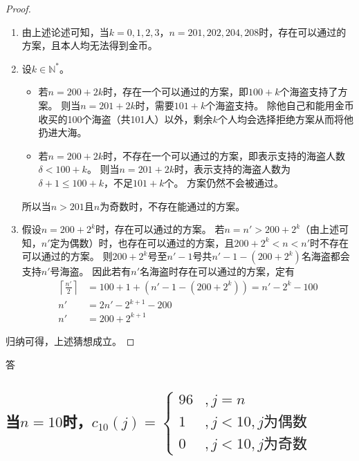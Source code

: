 \begin{questions}
\begin{solution}
        \begin{proof}
            \begin{enumerate}
                \item 由上述论述可知，当$k=0,1,2,3$，$n=201,202,204,208$时，存在可以通过的方案，且本人均无法得到金币。
                \item {
                      设$k \in \mathbb{N}^*$。
                      \begin{itemize}
                          \item 若$n=200+2k$时，存在一个可以通过的方案，即$100 + k$个海盗支持了方案。
                                则当$n=201+2k$时，需要$101 + k$个海盗支持。
                                除他自己和能用金币收买的100个海盗（共101人）以外，剩余$k$个人均会选择拒绝方案从而将他扔进大海。
                          \item 若$n=200+2k$时，不存在一个可以通过的方案，即表示支持的海盗人数$\delta < 100 + k$。
                                则当$n=201+2k$时，表示支持的海盗人数为$\delta + 1 \leq 100 + k$，不足$101 + k$个。
                                方案仍然不会被通过。
                      \end{itemize}
                      所以当$n > 201$且$n$为奇数时，不存在能通过的方案。
                      }
                \item {
                      假设$n=200+2^k$时，存在可以通过的方案。
                      若$n = n' > 200+2^k$（由上述可知，$n'$定为偶数）时，也存在可以通过的方案，且$200+2^k < n < n'$时不存在可以通过的方案。
                      则$200+2^k$号至$n'-1$号共$n'-1 - (200+2^k)$名海盗都会支持$n'$号海盗。
                      因此若有$n'$名海盗时存在可以通过的方案，定有\begin{align*}
                          \left\lceil \frac{n'}{2} \right\rceil & = 100 + 1 + (n'-1 - (200+2^k)) = n' - 2^k - 100 \\
                          n'                                    & = 2n' - 2^{k+1} - 200                           \\
                          n'                                    & = 200 + 2^{k+1}
                      \end{align*}
                      }
            \end{enumerate}
            归纳可得，上述猜想成立。
        \end{proof}

        \textsf{答} \quad
        \begin{parts}
            \part{
                当$n=10$时，$
                    c_{10}(j) = \begin{cases}
                        96 & , j=n                    \\
                        1  & , j<10 , j \text{为偶数} \\
                        0  & , j<10 , j \text{为奇数}
                    \end{cases}
                $
            }

\end{parts}
\end{solution}
\end{questions}
